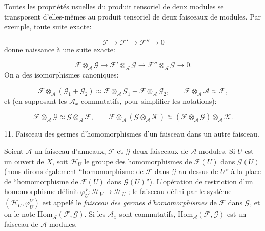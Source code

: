 Toutes les propriétés usuelles du produit tensoriel de deux modules se transposent d'elles-mêmes au produit tensoriel de deux faisceaux de modules. Par exemple, toute suite exacte:

\begin{equation*}
\mathcal{F} \to \mathcal{F}' \to \mathcal{F}'' \to 0
\end{equation*}
donne naissance à une suite exacte:

\begin{equation*}
\mathcal{F} \otimes_{\mathcal{A}} \mathcal{G} \to \mathcal{F}' \otimes_{\mathcal{A}} \mathcal{G} \to \mathcal{F}'' \otimes_{\mathcal{A}} \mathcal{G} \to 0.
\end{equation*}
On a des isomorphismes canoniques:

\begin{equation*}
\mathcal{F} \otimes_{\mathcal{A}} (\mathcal{G}_1 + \mathcal{G}_2) \approx \mathcal{F} \otimes_{\mathcal{A}} \mathcal{G}_1 + \mathcal{F} \otimes_{\mathcal{A}} \mathcal{G}_2 , \qquad \mathcal{F} \otimes_{\mathcal{A}} \mathcal{A} \approx \mathcal{F},
\end{equation*}
et (en supposant les $\mathcal{A}_x$ commutatifs, pour simplifier les notations):

\begin{equation*}
\mathcal{F} \otimes_{\mathcal{A}} \mathcal{G} \approx \mathcal{G} \otimes_{\mathcal{A}} \mathcal{F}, \qquad \mathcal{F} \otimes_{\mathcal{A}} (\mathcal{G} \otimes_{\mathcal{A}} \mathcal{K}) \approx (\mathcal{F} \otimes_{\mathcal{A}} \mathcal{G}) \otimes_{\mathcal{A}} \mathcal{K}.
\end{equation*}

11. Faisceau des germes d'homomorphismes d'un faisceau dans un autre faisceau.

Soient $\mathcal{A}$ un faisceau d'anneaux, $\mathcal{F}$ et $\mathcal{G}$ deux faisceaux de $\mathcal{A}$-modules. Si $U$ est un ouvert de $X$, soit $\mathcal{H}_U$ le groupe des homomorphismes de $\mathcal{F}(U)$ dans $\mathcal{G}(U)$ (nous dirons également ``homomorphisme de $\mathcal{F}$ dans $\mathcal{G}$ au-dessus de $U$'' à la place de ``homomorphisme de $\mathcal{F}(U)$ dans $\mathcal{G}(U)$''). L'opération de restriction d'un homomorphisme définit $\varphi_U^V : \mathcal{H}_V \to \mathcal{H}_U$ ; le faisceau défini par le système $(\mathcal{H}_U , \varphi_U^V)$ est appelé le \textit{faisceau des germes d'homomorphismes} de $\mathcal{F}$ dans $\mathcal{G}$, et on le note $\mathrm{Hom}_{\mathcal{A}}(\mathcal{F}, \mathcal{G})$. Si les $\mathcal{A}_x$ sont commutatifs, $\mathrm{Hom}_{\mathcal{A}}(\mathcal{F}, \mathcal{G})$ est un faisceau de $\mathcal{A}$-modules.

